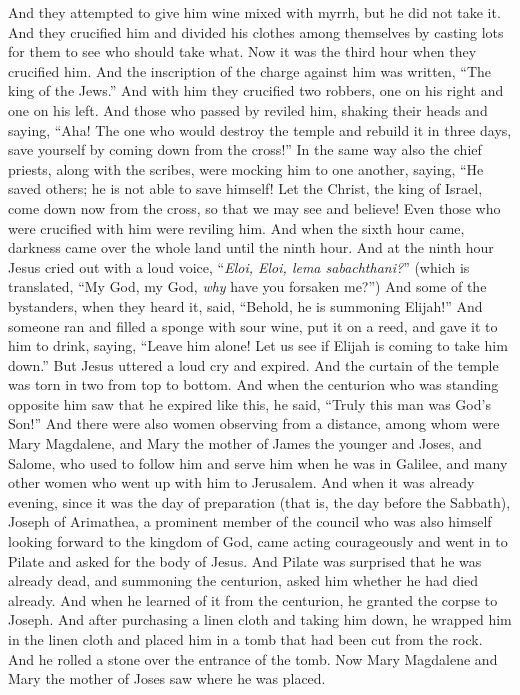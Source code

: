 \begin{biblechapter}
\verse And they attempted to give him wine mixed with myrrh, but he did not take it.
\verse And they crucified him and divided his clothes among themselves by casting lots for them to see who should take what.
\verse Now it was the third hour when they crucified him.
\verse And the inscription of the charge against him was written, “The king of the Jews.”
\verse And with him they crucified two robbers, one on his right and one on his left.
\verse And those who passed by reviled him, shaking their heads and saying, “Aha! The one who would destroy the temple and rebuild it in three days,
\verse save yourself by coming down from the cross!”
\verse In the same way also the chief priests, along with the scribes, were mocking him to one another, saying, “He saved others; he is not able to save himself!
\verse Let the Christ, the king of Israel, come down now from the cross, so that we may see and believe! Even those who were crucified with him were reviling him.
 And when the sixth hour came, darkness came over the whole land until the ninth hour.
\verse And at the ninth hour Jesus cried out with a loud voice, “\textit{Eloi, Eloi, lema sabachthani?}” (which is translated, “My God, my God, \textit{why} have you forsaken me?”)
\verse And some of the bystanders, when they heard it, said, “Behold, he is summoning Elijah!”
\verse And someone ran and filled a sponge with sour wine, put it on a reed, and gave it to him to drink, saying, “Leave him alone! Let us see if Elijah is coming to take him down.”
\verse But Jesus uttered a loud cry and expired.
\verse And the curtain of the temple was torn in two from top to bottom.
\verse And when the centurion who was standing opposite him saw that he expired like this, he said, “Truly this man was God’s Son!”
\verse And there were also women observing from a distance, among whom were Mary Magdalene, and Mary the mother of James the younger and Joses, and Salome,
\verse who used to follow him and serve him when he was in Galilee, and many other women who went up with him to Jerusalem.
 And when it was already evening, since it was the day of preparation (that is, the day before the Sabbath),
\verse Joseph of Arimathea, a prominent member of the council who was also himself looking forward to the kingdom of God, came acting courageously and went in to Pilate and asked for the body of Jesus.
\verse And Pilate was surprised that he was already dead, and summoning the centurion, asked him whether he had died already.
\verse And when he learned of it from the centurion, he granted the corpse to Joseph.
\verse And after purchasing a linen cloth and taking him down, he wrapped him in the linen cloth and placed him in a tomb that had been cut from the rock. And he rolled a stone over the entrance of the tomb.
\verse Now Mary Magdalene and Mary the mother of Joses saw where he was placed.
\end{biblechapter}

